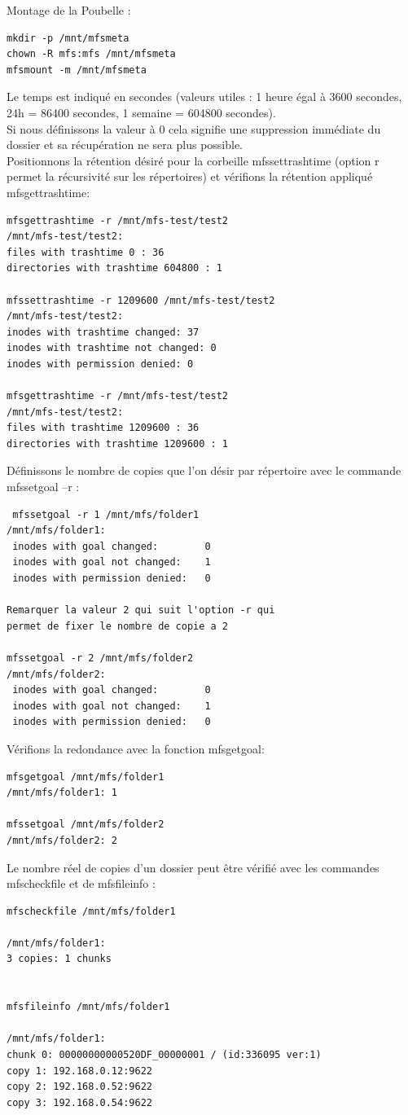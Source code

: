 \documentclass[12pt]{report}
\begin{document}
Montage de la Poubelle :\\
\begin{lstlisting}
mkdir -p /mnt/mfsmeta
chown -R mfs:mfs /mnt/mfsmeta
mfsmount -m /mnt/mfsmeta
	  \end{lstlisting}
Le temps est indiqué en secondes (valeurs utiles : 1 heure égal à 3600 secondes, 24h = 86400 secondes, 1 semaine = 604800 secondes).\\
Si nous définissons la valeur à 0 cela signifie une suppression immédiate du dossier et sa récupération ne sera plus possible. \\
Positionnons la rétention désiré pour la corbeille mfssettrashtime (option r permet la récursivité sur les répertoires) et vérifions la rétention appliqué mfsgettrashtime:
\begin{lstlisting}
mfsgettrashtime -r /mnt/mfs-test/test2
/mnt/mfs-test/test2:
files with trashtime 0 : 36
directories with trashtime 604800 : 1

mfssettrashtime -r 1209600 /mnt/mfs-test/test2
/mnt/mfs-test/test2:
inodes with trashtime changed: 37
inodes with trashtime not changed: 0
inodes with permission denied: 0

mfsgettrashtime -r /mnt/mfs-test/test2
/mnt/mfs-test/test2:
files with trashtime 1209600 : 36
directories with trashtime 1209600 : 1
	  \end{lstlisting}
Définissons le nombre de copies que l'on désir par répertoire avec le commande mfssetgoal –r :
\begin{lstlisting}
 mfssetgoal -r 1 /mnt/mfs/folder1
/mnt/mfs/folder1:
 inodes with goal changed:        0
 inodes with goal not changed:    1
 inodes with permission denied:   0

Remarquer la valeur 2 qui suit l'option -r qui 
permet de fixer le nombre de copie a 2

mfssetgoal -r 2 /mnt/mfs/folder2
/mnt/mfs/folder2:
 inodes with goal changed:        0
 inodes with goal not changed:    1
 inodes with permission denied:   0
	  \end{lstlisting}
Vérifions la redondance avec la fonction mfsgetgoal:
\begin{lstlisting}
mfsgetgoal /mnt/mfs/folder1
/mnt/mfs/folder1: 1

mfssetgoal /mnt/mfs/folder2
/mnt/mfs/folder2: 2
	  \end{lstlisting}
Le nombre réel de copies d'un dossier peut être vérifié avec les commandes mfscheckfile et de mfsfileinfo :
\begin{lstlisting}
mfscheckfile /mnt/mfs/folder1

/mnt/mfs/folder1:
3 copies: 1 chunks


mfsfileinfo /mnt/mfs/folder1

/mnt/mfs/folder1:
chunk 0: 00000000000520DF_00000001 / (id:336095 ver:1)
copy 1: 192.168.0.12:9622
copy 2: 192.168.0.52:9622
copy 3: 192.168.0.54:9622
\end{lstlisting}
\end{document}
